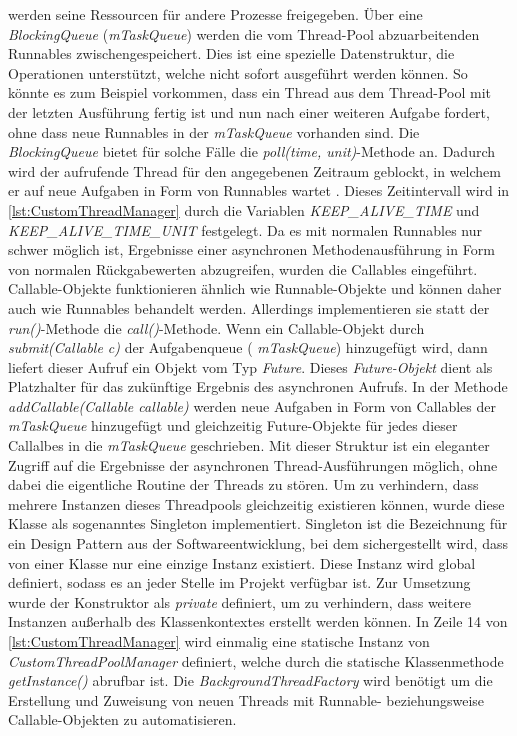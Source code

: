 werden seine Ressourcen für andere Prozesse freigegeben. Über eine \emph{ BlockingQueue} (\emph{mTaskQueue}) werden die vom Thread-Pool abzuarbeitenden Runnables zwischengespeichert. Dies ist eine spezielle Datenstruktur, die Operationen unterstützt, welche nicht sofort ausgeführt werden können. So könnte es zum Beispiel vorkommen, dass ein Thread aus dem Thread-Pool mit der letzten Ausführung fertig ist und nun nach einer weiteren Aufgabe fordert, ohne dass neue Runnables in der \emph{ mTaskQueue} vorhanden sind. Die \emph{ BlockingQueue} bietet für solche Fälle die \emph{poll(time, unit)}-Methode an. Dadurch wird der aufrufende Thread für den angegebenen Zeitraum geblockt, in welchem er auf neue Aufgaben in Form von Runnables wartet \cite{BlockingQueue}. Dieses Zeitintervall wird in \autoref{lst:CustomThreadManager} durch die Variablen \emph{ KEEP\_ALIVE\_TIME} und \emph{ KEEP\_ALIVE\_TIME\_UNIT} festgelegt. Da es mit normalen Runnables nur schwer möglich ist, Ergebnisse einer asynchronen Methodenausführung in Form von normalen Rückgabewerten abzugreifen, wurden die Callables eingeführt. Callable-Objekte funktionieren ähnlich wie Runnable-Objekte und können daher auch wie Runnables behandelt werden. Allerdings implementieren sie statt der \emph{run()}-Methode die \emph{call()}-Methode. Wenn ein Callable-Objekt durch \emph{submit(Callable c)} der Aufgabenqueue (\emph{ mTaskQueue}) hinzugefügt wird, dann  liefert  dieser Aufruf ein Objekt vom Typ \emph{Future}. Dieses \emph{Future-Objekt} dient als Platzhalter für das zukünftige Ergebnis des asynchronen Aufrufs.  In der Methode \emph{ addCallable(Callable callable)} werden neue Aufgaben in Form von Callables der \emph{ mTaskQueue} hinzugefügt und gleichzeitig Future-Objekte für jedes dieser Callalbes in die \emph{ mTaskQueue} geschrieben. Mit dieser Struktur ist ein eleganter Zugriff auf die Ergebnisse der asynchronen Thread-Ausführungen möglich, ohne dabei die eigentliche Routine der Threads zu stören. Um zu verhindern, dass mehrere Instanzen dieses Threadpools gleichzeitig existieren können, wurde diese Klasse als sogenanntes Singleton implementiert. Singleton ist die Bezeichnung für ein Design Pattern aus der Softwareentwicklung, bei dem sichergestellt wird, dass von einer Klasse nur eine einzige Instanz existiert. Diese Instanz wird global definiert, sodass es an jeder Stelle im Projekt verfügbar ist.  Zur Umsetzung wurde der Konstruktor als \emph{private} definiert, um zu verhindern, dass weitere Instanzen außerhalb des Klassenkontextes erstellt werden können. In Zeile 14 von \autoref{lst:CustomThreadManager} wird einmalig eine statische Instanz von \emph{CustomThreadPoolManager} definiert, welche durch die statische Klassenmethode \emph{getInstance()} abrufbar ist. Die \emph{BackgroundThreadFactory} wird benötigt um die Erstellung und Zuweisung von neuen Threads mit Runnable-  beziehungsweise Callable-Objekten zu automatisieren.

